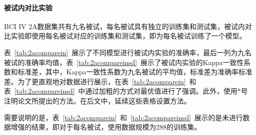 \paragraph{被试内对比实验}

BCI IV 2A数据集共有九名被试，每名被试具有独立的训练集和测试集，被试内对比实验即使用每名被试对应的训练集和测试集，即为每名被试训练了一个模型。

表~\ref{tab:2acomparein}~展示了不同模型进行被试内实验的准确率，最后一列为九名被试的准确率均值，表~\ref{tab:2acompareinsd}~展示了被试内实验的Kappa一致性系数和标准差，其中，Kappa一致性系数为九名被试的平均值，标准差为准确率标准差。为了更直观地对数据进行展示，在表~\ref{tab:2acomparein}~和表~\ref{tab:2acompareinsd}~中通过加粗的方式对最优值进行了强调。此外，使用*号注明论文所提出的方法。在后文中，延续这些表格设置方法。

需要说明的是，表~\ref{tab:2acomparein}~和~\ref{tab:2acompareinsd}~展示的是未进行数据增强的结果，即对于每名被试，使用数据规模为288的训练集。

